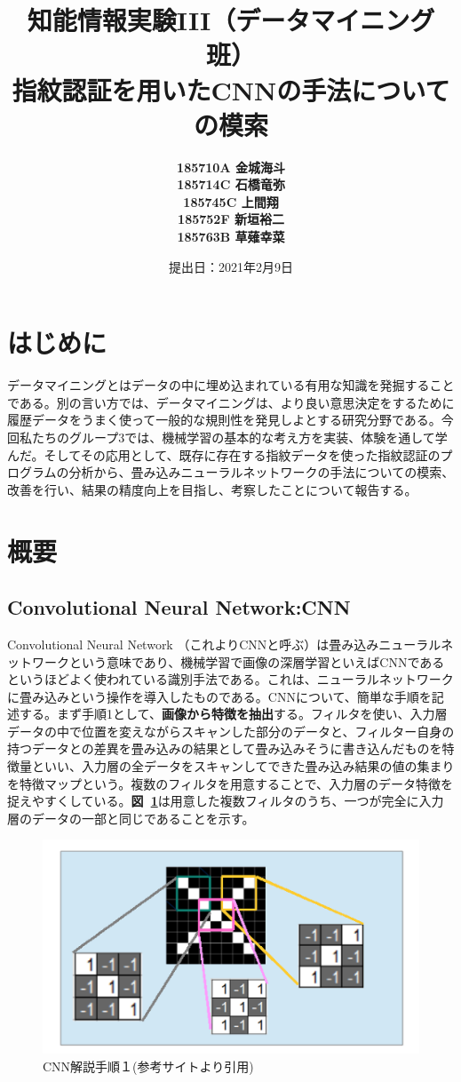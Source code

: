 \documentclass[a4paper, 11pt, titlepage]{jsarticle}
\title{知能情報実験III（データマイニング班）\\指紋認証を用いたCNNの手法についての模索}
\author{\textbf{185710A 金城海斗}\\
\textbf{185714C 石橋竜弥}\\
 \textbf{185745C 上間翔}\\
 \textbf{185752F 新垣裕二}\\
 \textbf{185763B 草薙幸菜}}
\date{提出日：2021年2月9日}
\begin{document}
\maketitle
\tableofcontents
\clearpage


\section{はじめに}
データマイニングとはデータの中に埋め込まれている有用な知識を発掘することである。別の言い方では、データマイニングは、より良い意思決定をするために履歴データをうまく使って一般的な規則性を発見しよとする研究分野である。今回私たちのグループ3では、機械学習の基本的な考え方を実装、体験を通して学んだ。そしてその応用として、既存に存在する指紋データを使った指紋認証のプログラムの分析から、畳み込みニューラルネットワークの手法についての模索、改善を行い、結果の精度向上を目指し、考察したことについて報告する。
\section{概要}

\subsection{Convolutional Neural Network:CNN}
Convolutional Neural Network （これよりCNNと呼ぶ）は畳み込みニューラルネットワークという意味であり、機械学習で画像の深層学習といえばCNNであるというほどよく使われている識別手法である。これは、ニューラルネットワークに畳み込みという操作を導入したものである。CNNについて、簡単な手順を記述する。まず手順1として、\textbf{画像から特徴を抽出}する。フィルタを使い、入力層データの中で位置を変えながらスキャンした部分のデータと、フィルター自身の持つデータとの差異を畳み込みの結果として畳み込みそうに書き込んだものを特徴量といい、入力層の全データをスキャンしてできた畳み込み結果の値の集まりを特徴マップという。複数のフィルタを用意することで、入力層のデータ特徴を捉えやすくしている。\textbf{図~\ref{cnn1}}は用意した複数フィルタのうち、一つが完全に入力層のデータの一部と同じであることを示す。

\begin{figure}[h]
  \centering
  \includegraphics[scale=0.4]{cnn1.png}
  \caption{CNN解説手順１(参考サイト\cite{cnn}より引用)}
  \label{cnn1}
\end{figure}
\end{document}

